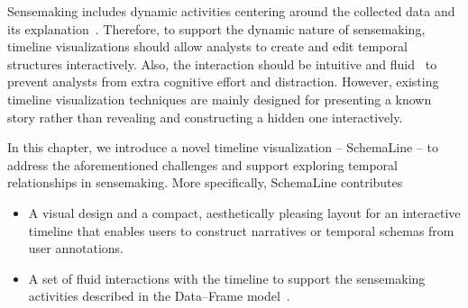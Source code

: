 Sensemaking includes dynamic activities centering around the collected data and its explanation~\cite{Klein2003}. Therefore, to support the dynamic nature of sensemaking, timeline visualizations should allow analysts to create and edit temporal structures interactively. Also, the interaction should be intuitive and fluid~\cite{Elmqvist2011} to prevent analysts from extra cognitive effort and distraction. However, existing timeline visualization techniques are mainly designed for presenting a known story rather than revealing and constructing a hidden one interactively.

In this chapter, we introduce a novel timeline visualization -- SchemaLine -- to address the aforementioned challenges and support exploring temporal relationships in sensemaking. More specifically, SchemaLine contributes
\begin{itemize}
	\item A visual design and a compact, aesthetically pleasing layout for an interactive timeline that enables users to construct narratives or temporal schemas from user annotations.
	\item A set of fluid interactions with the timeline to support the sensemaking activities described in the Data--Frame model~\cite{Klein2003}.
\end{itemize}
